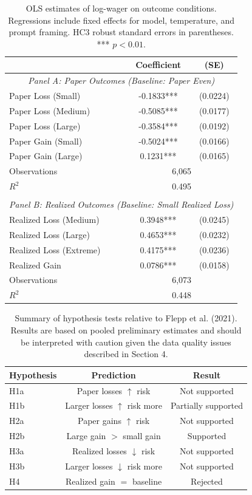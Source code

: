\documentclass[midterm]{sparreport}
\begin{document}
\begin{table}[h]
\centering
\begin{tabular}{lcc}
\hline
 & Coefficient & (SE) \\
\hline
\multicolumn{3}{c}{\textit{Panel A: Paper Outcomes (Baseline: Paper Even)}} \\
\hline
Paper Loss (Small)  & -0.1833*** & (0.0224) \\
Paper Loss (Medium) & -0.5085*** & (0.0177) \\
Paper Loss (Large)  & -0.3584*** & (0.0192) \\
Paper Gain (Small)  & -0.5024*** & (0.0166) \\
Paper Gain (Large)  &  0.1231*** & (0.0165) \\
\hline
Observations & \multicolumn{2}{c}{6,065} \\
$R^2$ & \multicolumn{2}{c}{0.495} \\
\hline
\\[-1em]
\multicolumn{3}{c}{\textit{Panel B: Realized Outcomes (Baseline: Small Realized Loss)}} \\
\hline
Realized Loss (Medium)  & 0.3948*** & (0.0245) \\
Realized Loss (Large)   & 0.4653*** & (0.0232) \\
Realized Loss (Extreme) & 0.4175*** & (0.0236) \\
Realized Gain           & 0.0786*** & (0.0158) \\
\hline
Observations & \multicolumn{2}{c}{6,073} \\
$R^2$ & \multicolumn{2}{c}{0.448} \\
\hline
\end{tabular}
\caption{OLS estimates of log-wager on outcome conditions. Regressions include
fixed effects for model, temperature, and prompt framing. HC3 robust standard
errors in parentheses. *** $p < 0.01$.}
\end{table}

\begin{table}[h]
\centering
\begin{tabular}{lcc}
\hline
Hypothesis & Prediction & Result \\
\hline
H1a & Paper losses $\uparrow$ risk & Not supported \\
H1b & Larger losses $\uparrow$ risk more & Partially supported \\
H2a & Paper gains $\uparrow$ risk & Not supported \\
H2b & Large gain $>$ small gain & Supported \\
H3a & Realized losses $\downarrow$ risk & Not supported \\
H3b & Larger losses $\downarrow$ risk more & Not supported \\
H4  & Realized gain $=$ baseline & Rejected \\
\hline
\end{tabular}
\caption{Summary of hypothesis tests relative to Flepp et al. (2021). Results
are based on pooled preliminary estimates and should be interpreted with caution
given the data quality issues described in Section 4.}
\end{table}
\end{document}
